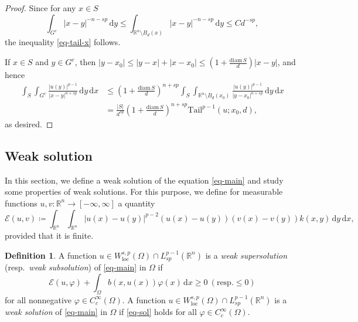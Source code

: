 \documentclass[11pt]{amsart}
\theoremstyle{plain}
\theoremstyle{definition}
\newtheorem{definition}[theorem]{Definition}
\numberwithin{equation}{section}
\begin{document}
\begin{proof}
Since for any $x \in S$
\begin{equation*}
\int_{G^c} |x-y|^{-n-sp} \,\mathrm{d}y \leq \int_{\mathbb{R}^n \setminus B_d(x)} |x-y|^{-n-sp} \,\mathrm{d}y \leq C d^{-sp},
\end{equation*}
the inequality \eqref{eq-tail-x} follows.

If $x \in S$ and $y \in G^c$, then $|y-x_0| \leq |y-x|+|x-x_0| \leq (1+\frac{\mathrm{diam}\,S}{d})|x-y|$, and hence
\begin{align*}
\int_S \int_{G^c} \frac{|u(y)|^{p-1}}{|x-y|^{n+sp}} \,\mathrm{d}y \,\mathrm{d}x
&\leq \left( 1+\frac{\mathrm{diam}\,S}{d} \right)^{n+sp} \int_S \int_{\mathbb{R}^n \setminus B_d(x_0)} \frac{|u(y)|^{p-1}}{|y-x_0|^{n+sp}} \,\mathrm{d}y \,\mathrm{d}x \\
&= \frac{|S|}{d^{sp}} \left( 1+\frac{\mathrm{diam}\,S}{d} \right)^{n+sp} \mathrm{Tail}^{p-1}(u; x_0, d),
\end{align*}
as desired.
\end{proof}

\subsection{Weak solution}\label{sec-solution}

In this section, we define a weak solution of the equation \eqref{eq-main} and study some properties of weak solutions. For this purpose, we define for measurable functions $u, v: \mathbb{R}^n \to [-\infty, \infty]$ a quantity
\begin{equation*}
\mathcal{E}(u,v)\coloneqq\int_{\mathbb{R}^n} \int_{\mathbb{R}^n} |u(x)-u(y)|^{p-2}(u(x)-u(y))(v(x)-v(y)) k(x, y) \,\mathrm{d}y\,\mathrm{d}x,
\end{equation*}
provided that it is finite.

\begin{definition}\label{def-sol}
A function $u \in W^{s, p}_{\mathrm{loc}}(\Omega) \cap L^{p-1}_{sp}(\mathbb{R}^n)$ is a {\it weak supersolution} (resp.\ \emph{weak subsolution}) of \eqref{eq-main} in $\Omega$ if
\begin{equation}\label{eq-sol}
\mathcal{E}(u, \varphi) + \int_{\Omega}b(x, u(x))\varphi(x)\,\mathrm{d}x \geq 0 ~\left(\text{resp.} \leq 0 \right)
\end{equation}
for all nonnegative $\varphi \in C^\infty_c(\Omega)$. A function $u \in W^{s, p}_{\mathrm{loc}}(\Omega) \cap L^{p-1}_{sp}(\mathbb{R}^n)$ is a {\it weak solution} of \eqref{eq-main} in $\Omega$ if \eqref{eq-sol} holds for all $\varphi \in C^\infty_c(\Omega)$.
\end{definition}
\end{document}
